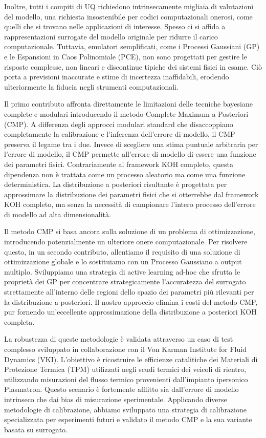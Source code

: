 \smallskip
Inoltre, tutti i compiti di UQ richiedono intrinsecamente migliaia di valutazioni del modello, una richiesta insostenibile per codici computazionali onerosi, come quelli che si trovano nelle applicazioni di interesse. Spesso ci si affida a rappresentazioni surrogate del modello originale per ridurre il carico computazionale. Tuttavia, emulatori semplificati, come i Processi Gaussiani (GP) e le Espansioni in Caos Polinomiale (PCE), non sono progettati per gestire le risposte complesse, non lineari e discontinue tipiche dei sistemi fisici in esame. Ciò porta a previsioni inaccurate e stime di incertezza inaffidabili, erodendo ulteriormente la fiducia negli strumenti computazionali.

\smallskip
Il primo contributo affronta direttamente le limitazioni delle tecniche bayesiane complete e modulari introducendo il metodo Complete Maximum a Posteriori (CMP). A differenza degli approcci modulari standard che disaccoppiano completamente la calibrazione e l'inferenza dell'errore di modello, il CMP preserva il legame tra i due.
Invece di scegliere una stima puntuale arbitraria per l'errore di modello, il CMP permette all'errore di modello di essere una funzione dei parametri fisici. Contrariamente al framework KOH completo, questa dipendenza non \`e trattata come un processo aleatorio ma come una funzione deterministica.
La distribuzione a posteriori risultante \`e progettata per approssimare la distribuzione dei parametri fisici che si otterrebbe dal framework KOH completo, ma senza la necessit\`a di campionare l'intero processo dell'errore di modello ad alta dimensionalit\`a.

\smallskip
Il metodo CMP si basa ancora sulla soluzione di un problema di ottimizzazione, introducendo potenzialmente un ulteriore onere computazionale. Per risolvere questo,
in un secondo contributo, allentiamo il requisito di una soluzione di ottimizzazione globale e lo sostituiamo con un Processo Gaussiano a output multiplo. Sviluppiamo una strategia di active learning ad-hoc che sfrutta le propriet\`a dei GP per concentrare strategicamente l'accuratezza del surrogato strettamente all'interno delle regioni dello spazio dei parametri pi\`u rilevanti per la distribuzione a posteriori. Il nostro approccio elimina i costi del metodo CMP, pur fornendo un'eccellente approssimazione della distribuzione a posteriori KOH completa.

\smallskip
La robustezza di queste metodologie \`e validata attraverso un caso di test complesso sviluppato in collaborazione con il Von Karman Institute for Fluid Dynamics (VKI). L'obiettivo \`e ricostruire le efficienze catalitiche dei Materiali di Protezione Termica (TPM) utilizzati negli scudi termici dei veicoli di rientro, utilizzando misurazioni del flusso termico provenienti dall'impianto ipersonico Plasmatron. Questo scenario \`e fortemente afflitto sia dall'errore di modello intrinseco che dai bias di misurazione sperimentale. Applicando diverse metodologie di calibrazione, abbiamo sviluppato una strategia di calibrazione specializzata per esperimenti futuri e validato il metodo CMP e la sua variante basata su surrogato.

